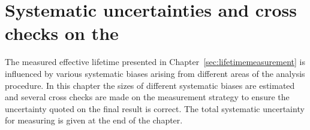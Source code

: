 \chapter{{\bf Systematic uncertainties and cross checks on the \el}}
\label{sec:systematics}
The measured \bsmumu effective lifetime presented in Chapter~\ref{sec:lifetimemeasurement} is influenced by various systematic biases arising from different areas of the analysis procedure. In this chapter the sizes of different systematic biases are estimated and several cross checks are made on the measurement strategy to ensure the uncertainty quoted on the final result is correct. The total systematic uncertainty for measuring \tmumu is given at the end of the chapter.


